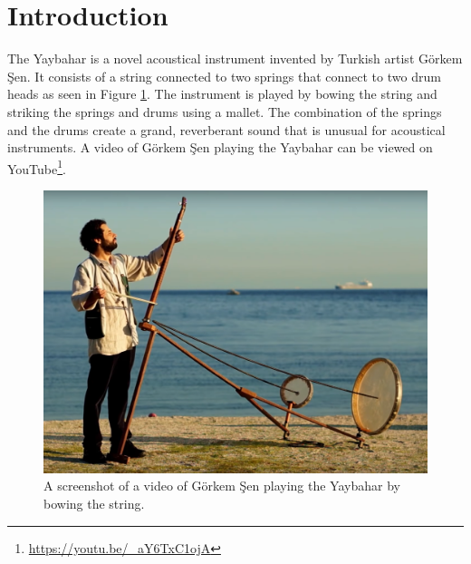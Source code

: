 \documentclass{article}
\title{\papertitle}
\begin{document}
%
\capstartfalse
\maketitle
\capstarttrue
%
\begin{abstract}
In this paper, finite difference schemes (FDSs) are adopted to model a specific instrument, the Yaybahar, invented by Turkish artist Görkem Şen.
Each part of the instrument is simulated independently and its physical behavior is explained in an intuitive yet accurate manner. 
The models are implemented in C++ to form an interactive, real-time application, whose architecture and optimization are discussed.
\end{abstract}
%

\section{Introduction}\label{sec:introduction}
\nocite{Someone:00}

The Yaybahar is a novel acoustical instrument invented by Turkish artist Görkem Şen. It consists of a string connected to two springs that connect to two drum heads as seen in Figure \ref{fig:yaybahar}.
The instrument is played by bowing the string and striking the springs and drums using a mallet.
The combination of the springs and the drums create a grand, reverberant sound that is unusual for acoustical instruments.
A video of Görkem Şen playing the Yaybahar can be viewed on YouTube\footnote{\url{https://youtu.be/_aY6TxC1ojA}\label{fn:videoUrl}}.

\begin{figure}[h]
    \centering
    \includegraphics[width=\linewidth]{yaybahar.png}
    \caption{A screenshot of a video 
    of Görkem Şen playing the Yaybahar by bowing the string.}
    \label{fig:yaybahar}
\end{figure}
\end{document}
